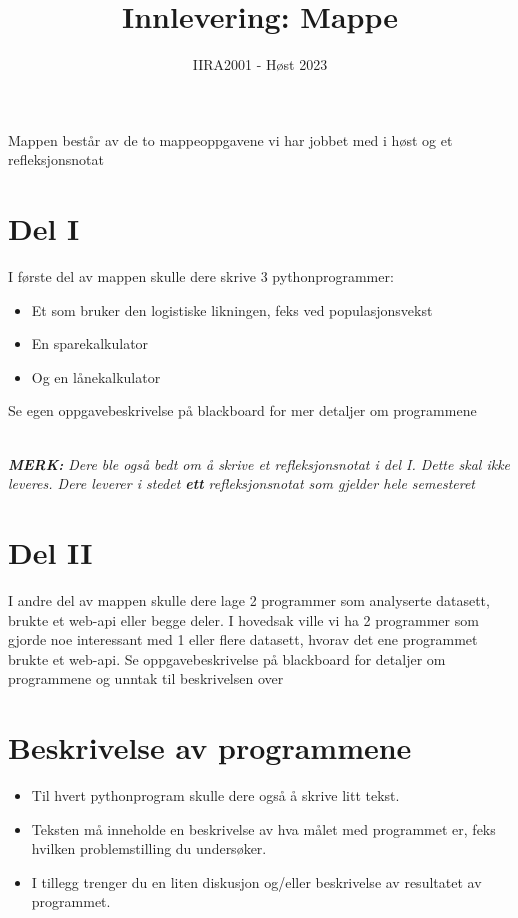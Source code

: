 \documentclass[12pt, titlepage]{article}
\begin{document}
\title{Innlevering: Mappe}
\author{IIRA2001 - Høst 2023}
\date{}
\maketitle

Mappen består av de to mappeoppgavene vi har jobbet med i høst og et refleksjonsnotat

\section*{Del I}

I første del av mappen skulle dere skrive 3 pythonprogrammer:
\begin{itemize}
   \item {Et som bruker den logistiske likningen, feks ved populasjonsvekst}
   \item {En sparekalkulator}
   \item {Og en lånekalkulator}
\end{itemize}
Se egen oppgavebeskrivelse på blackboard for mer detaljer om programmene

~\\
\textit{\textbf{MERK:} Dere ble også bedt om å skrive et refleksjonsnotat i del I. Dette skal ikke leveres.
Dere leverer i stedet \textbf{ett} refleksjonsnotat som gjelder hele semesteret}

\section*{Del II}

I andre del av mappen skulle dere lage 2 programmer som analyserte datasett, brukte et web-api eller begge deler.
I hovedsak ville vi ha 2 programmer som gjorde noe interessant med 1 eller flere datasett, hvorav det ene programmet brukte et web-api.
Se oppgavebeskrivelse på blackboard for detaljer om programmene og unntak til beskrivelsen over

\section*{Beskrivelse av programmene}

\begin{itemize}
   \item{Til hvert pythonprogram skulle dere også å skrive litt tekst. }
   \item {Teksten må inneholde en beskrivelse av hva målet med programmet er, feks hvilken problemstilling du undersøker.}
   \item {I tillegg trenger du en liten diskusjon og/eller beskrivelse av resultatet av programmet. }
\end{itemize}
\end{document}
